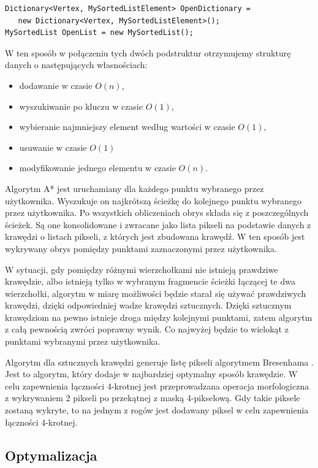 \documentclass[a4paper,11pt,twoside,openright]{report}
\theoremstyle{definition}
\begin{document}
\begin{verbatim}
Dictionary<Vertex, MySortedListElement> OpenDictionary =
   new Dictionary<Vertex, MySortedListElement>();
MySortedList OpenList = new MySortedList();
\end{verbatim}

W ten sposób w połączeniu tych dwóch podstruktur otrzymujemy strukturę danych
o następujących własnościach:
\begin{itemize}[noitemsep]
\item dodawanie w czasie $O(n)$,
\item wyszukiwanie po kluczu w czasie $O(1)$,
\item wybieranie najmniejszy element według wartości w czasie $O(1)$,
\item usuwanie w czasie $O(1)$
\item modyfikowanie jednego elementu w czasie $O(n)$.
\end{itemize}

Algorytm A* jest uruchamiany dla każdego punktu wybranego przez użytkownika.
Wyszukuje on najkrótszą ścieżkę do kolejnego punktu wybranego przez użytkownika.
Po wszystkich obliczeniach obrys składa się z poszczególnych ścieżek. Są one
konsolidowane i zwracane jako lista pikseli na podstawie danych z krawędzi o
listach pikseli, z których jest zbudowana krawędź. W ten sposób jest wykrywany
obrys pomiędzy punktami zaznaczonymi przez użytkownika.

W sytuacji, gdy pomiędzy różnymi wierzchołkami nie istnieją prawdziwe krawędzie,
albo istnieją tylko w wybranym fragmencie ścieżki łączącej te dwa wierzchołki,
algorytm w miarę możliwości będzie starał się używać prawdziwych krawędzi, dzięki
odpowiedniej wadze krawędzi sztucznych. Dzięki sztucznym krawędziom na pewno
istnieje droga między kolejnymi punktami, zatem algorytm z całą pewnością zwróci
poprawny wynik. Co najwyżej będzie to wielokąt z punktami wybranymi przez użytkownika.

Algorytm dla sztucznych krawędzi generuje listę pikseli algorytmem Bresenhama
\cite{Bresenham}. Jest to algorytm, który dodaje w najbardziej optymalny sposób
krawędzie. W celu zapewnienia łączności 4-krotnej jest przeprowadzana operacja
morfologiczna z wykrywaniem 2 pikseli po przekątnej z maską 4-pikselową. Gdy takie
piksele zostaną wykryte, to na jednym z rogów jest dodawany piksel w celu
zapewnienia łączności 4-krotnej.

\subsection {Optymalizacja}
\end{document}
